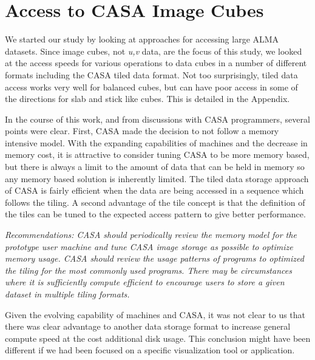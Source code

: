 
\section{Access to CASA Image Cubes}

We started our study by looking at approaches for accessing large
ALMA datasets. Since image cubes, not {\it u,v} data, are the
focus of this study, we looked at the access speeds for various
operations to data cubes in a number of different formats including
the CASA tiled data format. Not too surprisingly, tiled data
access works very well for balanced cubes, but can have poor
access in some of the directions for slab and stick like cubes.
This is detailed in the Appendix.

In the course of this work, and from discussions with CASA programmers,
several points were clear. First, CASA made the decision to not follow
a memory intensive model. With the expanding capabilities of machines and
the decrease in memory cost, it is attractive to consider tuning CASA
to be more memory based, but there is always a limit to the amount of
data that can be held in memory so any memory based solution is
inherently limited. The tiled data storage approach of CASA is
fairly efficient when the data are being accessed in a sequence which
follows the tiling. A second advantage of the tile concept is that
the definition of the tiles can be tuned to the expected access pattern
to give better performance.

{\it Recommendations: CASA should periodically review the memory model
for the prototype user machine and tune CASA image storage as possible to optimize
memory usage. CASA should review the usage patterns of programs to
optimized the tiling for the most commonly used programs. There may be
circumstances where it is sufficiently compute efficient to encourage users
to store a given dataset in multiple tiling formats.}

Given the evolving capability of machines and CASA, it was not clear to us
that there was clear advantage to another data storage format to increase
general compute speed at the cost additional disk usage. This conclusion
might have been different if we had been focused on a specific visualization
tool or application.

